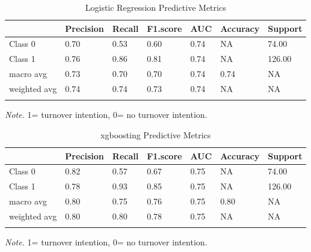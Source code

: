 \documentclass[
  man]{apa7}
\begin{document}
\begin{table}[tbp]

\begin{center}
\begin{threeparttable}

\caption{\label{tab:logitable1k}Logistic Regression Predictive Metrics}

\begin{tabular}{lllllll}
\toprule
 & \multicolumn{1}{c}{Precision} & \multicolumn{1}{c}{Recall} & \multicolumn{1}{c}{F1.score} & \multicolumn{1}{c}{AUC} & \multicolumn{1}{c}{Accuracy} & \multicolumn{1}{c}{Support}\\
\midrule
Class 0 & 0.70 & 0.53 & 0.60 & 0.74 & NA & 74.00\\
Class 1 & 0.76 & 0.86 & 0.81 & 0.74 & NA & 126.00\\
macro avg & 0.73 & 0.70 & 0.70 & 0.74 & 0.74 & NA\\
weighted avg & 0.74 & 0.74 & 0.73 & 0.74 & NA & NA\\
\bottomrule
\addlinespace
\end{tabular}

\begin{tablenotes}[para]
\normalsize{\textit{Note.} 1= turnover intention, 0= no turnover intention.}
\end{tablenotes}

\end{threeparttable}
\end{center}

\end{table}

\begin{table}[tbp]

\begin{center}
\begin{threeparttable}

\caption{\label{tab:xgbtable1k}xgboosting Predictive Metrics}

\begin{tabular}{lllllll}
\toprule
 & \multicolumn{1}{c}{Precision} & \multicolumn{1}{c}{Recall} & \multicolumn{1}{c}{F1.score} & \multicolumn{1}{c}{AUC} & \multicolumn{1}{c}{Accuracy} & \multicolumn{1}{c}{Support}\\
\midrule
Class 0 & 0.82 & 0.57 & 0.67 & 0.75 & NA & 74.00\\
Class 1 & 0.78 & 0.93 & 0.85 & 0.75 & NA & 126.00\\
macro avg & 0.80 & 0.75 & 0.76 & 0.75 & 0.80 & NA\\
weighted avg & 0.80 & 0.80 & 0.78 & 0.75 & NA & NA\\
\bottomrule
\addlinespace
\end{tabular}

\begin{tablenotes}[para]
\normalsize{\textit{Note.} 1= turnover intention, 0= no turnover intention.}
\end{tablenotes}

\end{threeparttable}
\end{center}

\end{table}
\end{document}
